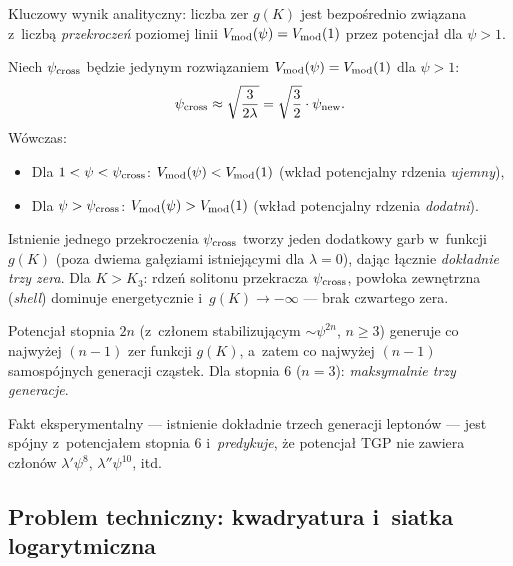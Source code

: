 Kluczowy wynik analityczny: liczba zer $g(K)$ jest bezpośrednio
związana z~liczbą \emph{przekroczeń} poziomej linii $V_{\rm mod}(\psi) = V_{\rm mod}(1)$
przez potencjał dla $\psi > 1$.

\begin{theorem}%
\label{thm:trzy-zera}
Niech $\psi_{\rm cross}$ będzie jedynym rozwiązaniem
$V_{\rm mod}(\psi) = V_{\rm mod}(1)$ dla $\psi > 1$:
\begin{equation}\label{eq:psi-cross}
    \psi_{\rm cross} \approx \sqrt{\frac{3}{2\lambda}}
    = \sqrt{\frac{3}{2}}\cdot\psi_{\rm new}.
\end{equation}
Wówczas:
\begin{itemize}[nosep]
    \item Dla $1 < \psi < \psi_{\rm cross}$:
          $V_{\rm mod}(\psi) < V_{\rm mod}(1)$
          (wkład potencjalny rdzenia \emph{ujemny}),
    \item Dla $\psi > \psi_{\rm cross}$:
          $V_{\rm mod}(\psi) > V_{\rm mod}(1)$
          (wkład potencjalny rdzenia \emph{dodatni}).
\end{itemize}
Istnienie jednego przekroczenia $\psi_{\rm cross}$ tworzy jeden
dodatkowy garb w~funkcji $g(K)$ (poza dwiema gałęziami istniejącymi
dla $\lambda = 0$), dając łącznie \emph{dokładnie trzy zera}.
Dla $K > K_3$: rdzeń solitonu przekracza $\psi_{\rm cross}$,
powłoka zewnętrzna (\emph{shell}) dominuje energetycznie
i~$g(K) \to -\infty$ — brak czwartego zera.
\end{theorem}

\begin{corollary}%
\label{cor:stopien}
Potencjał stopnia $2n$ (z~członem stabilizującym $\sim\psi^{2n}$,
$n \geq 3$) generuje co najwyżej $(n-1)$ zer funkcji $g(K)$,
a~zatem co najwyżej $(n-1)$ samospójnych generacji cząstek.
Dla stopnia 6 ($n=3$): \emph{maksymalnie trzy generacje}.

Fakt eksperymentalny — istnienie dokładnie trzech generacji leptonów —
jest spójny z~potencjałem stopnia 6 i~\emph{predykuje}, że potencjał
TGP nie zawiera członów $\lambda'\psi^8$, $\lambda''\psi^{10}$, itd.
\end{corollary}

\subsection{Problem techniczny: kwadryatura i~siatka logarytmiczna}%
\label{app:I-kwadryatura}

